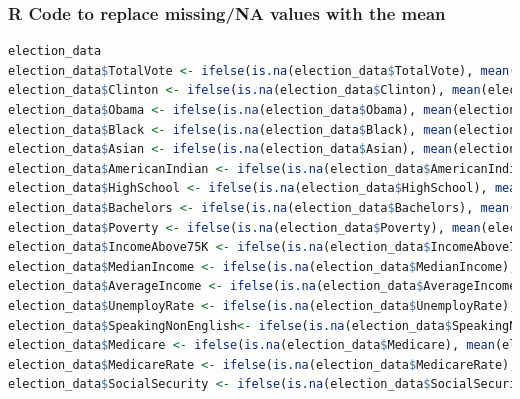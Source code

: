 \documentclass[11pt]{article}
\begin{document}
\subsubsection{R Code to replace missing/NA values with the mean}
\begin{lstlisting}[language=R]
election_data
election_data$TotalVote <- ifelse(is.na(election_data$TotalVote), mean(election_data$TotalVote, na.rm=TRUE), election_data$TotalVote)
election_data$Clinton <- ifelse(is.na(election_data$Clinton), mean(election_data$Clinton, na.rm=TRUE), election_data$Clinton)
election_data$Obama <- ifelse(is.na(election_data$Obama), mean(election_data$Obama, na.rm=TRUE), election_data$Obama)
election_data$Black <- ifelse(is.na(election_data$Black), mean(election_data$Black, na.rm=TRUE), election_data$Black)
election_data$Asian <- ifelse(is.na(election_data$Asian), mean(election_data$Asian, na.rm=TRUE), election_data$Asian)
election_data$AmericanIndian <- ifelse(is.na(election_data$AmericanIndian), mean(election_data$AmericanIndian, na.rm=TRUE), election_data$AmericanIndian)
election_data$HighSchool <- ifelse(is.na(election_data$HighSchool), mean(election_data$HighSchool, na.rm=TRUE), election_data$HighSchool)
election_data$Bachelors <- ifelse(is.na(election_data$Bachelors), mean(election_data$Bachelors, na.rm=TRUE), election_data$Bachelors)
election_data$Poverty <- ifelse(is.na(election_data$Poverty), mean(election_data$Poverty, na.rm=TRUE), election_data$Poverty)
election_data$IncomeAbove75K <- ifelse(is.na(election_data$IncomeAbove75K), mean(election_data$IncomeAbove75K, na.rm=TRUE), election_data$IncomeAbove75K)
election_data$MedianIncome <- ifelse(is.na(election_data$MedianIncome), mean(election_data$MedianIncome, na.rm=TRUE), election_data$MedianIncome)
election_data$AverageIncome <- ifelse(is.na(election_data$AverageIncome), mean(election_data$AverageIncome, na.rm=TRUE), election_data$AverageIncome)
election_data$UnemployRate <- ifelse(is.na(election_data$UnemployRate), mean(election_data$UnemployRate, na.rm=TRUE), election_data$UnemployRate)
election_data$SpeakingNonEnglish<- ifelse(is.na(election_data$SpeakingNonEnglish), mean(election_data$SpeakingNonEnglish, na.rm=TRUE), election_data$SpeakingNonEnglish)
election_data$Medicare <- ifelse(is.na(election_data$Medicare), mean(election_data$Medicare, na.rm=TRUE), election_data$Medicare)
election_data$MedicareRate <- ifelse(is.na(election_data$MedicareRate), mean(election_data$MedicareRate, na.rm=TRUE), election_data$MedicareRate)
election_data$SocialSecurity <- ifelse(is.na(election_data$SocialSecurity), mean(election_data$SocialSecurity, na.rm=TRUE), election_data$SocialSecurity)

\end{lstlisting}
\end{document}
